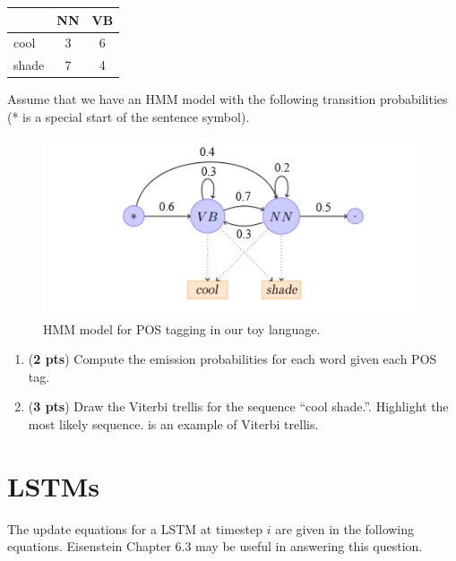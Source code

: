 \documentclass[11pt, letterpaper]{article}
\begin{document}
    \begin{table}[h!]
    \centering
    \small
    \begin{tabular}{|l | c | c |}
    \hline & NN & VB\\
    \hline
    cool & 3 & 6 \\
    shade & 7 & 4\\
    \hline
    \end{tabular}
    \end{table}
    Assume that we have an HMM model with the following transition probabilities (* is a special start of the sentence symbol).
    
    \begin{figure}[h]
    \centering
    \includegraphics{images/HMM.jpg}
    \caption{HMM model for POS tagging in our toy language.}
    \end{figure}

\begin{enumerate}[label=(\alph*)]

\item (\textbf{2 pts}) Compute the emission probabilities for each word given each POS tag.\\

\item (\textbf{3 pts}) Draw the Viterbi trellis for the sequence “cool shade.”. Highlight the most likely sequence. \href{https://web.stanford.edu/~jurafsky/slp3/A.pdf#page=8}{\color{blue}{Here}} is an  example of Viterbi trellis.

\end{enumerate}

    

\section{LSTMs}


The update equations for a LSTM at timestep $i$ are given in the following equations. Eisenstein Chapter 6.3 may be useful in answering this question. 
\end{document}

